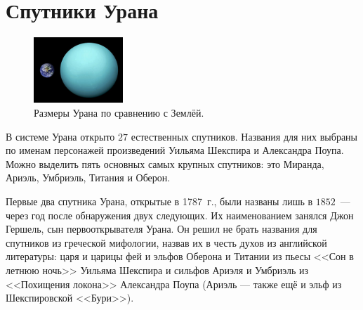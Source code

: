 \documentclass{article}
\begin{document}
    \section{Спутники Урана} 
    \begin{figure}
    	\centering 
    	\includegraphics[width = 0.3\textwidth]{img/Uranussizecomparison}
    	\caption{Размеры Урана по сравнению с Землёй.}
    \end{figure} 
    \hspace*{12pt} В системе Урана открыто $27$ естественных спутников. Названия для них выбраны по именам персонажей произведений Уильяма Шекспира и Александра Поупа. Можно выделить пять основных самых крупных спутников: это Миранда, Ариэль, Умбриэль, Титания и Оберон.\par 
    Первые два спутника Урана, открытые в 1787~г., были названы лишь в $1852$~--- через год после обнаружения двух следующих. Их наименованием занялся Джон Гершель, сын первооткрывателя Урана. Он решил не брать названия для спутников из греческой мифологии, назвав их в честь духов из английской литературы: царя и царицы фей и эльфов Оберона и Титании из пьесы <<Сон в летнюю ночь>> Уильяма Шекспира и сильфов Ариэля и Умбриэль из <<Похищения локона>> Александра Поупа (Ариэль --- также ещё и эльф из Шекспировской <<Бури>>).\\
\end{document}
